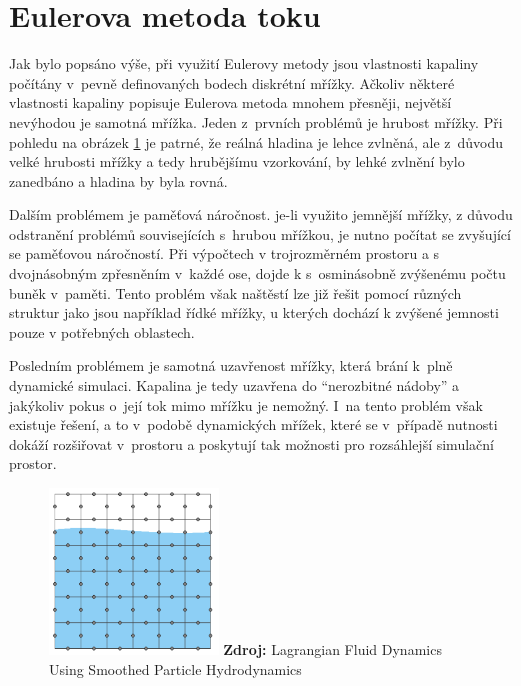 \section{Eulerova metoda toku}
Jak bylo popsáno výše, při využití Eulerovy metody jsou vlastnosti kapaliny počítány v~pevně definovaných bodech diskrétní mřížky. Ačkoliv některé vlastnosti kapaliny popisuje Eulerova metoda mnohem přesněji, největší nevýhodou je samotná mřížka. Jeden z~prvních problémů je hrubost mřížky. Při pohledu na obrázek \ref{fig:EulerGrid} je patrné, že reálná hladina je lehce zvlněná, ale z~důvodu velké hrubosti mřížky a tedy hrubějšímu vzorkování, by lehké zvlnění bylo zanedbáno a hladina by byla rovná.

Dalším problémem je paměťová náročnost. je-li využito jemnější mřížky, z důvodu odstranění problémů souvisejících s~hrubou mřížkou, je nutno počítat se zvyšující se paměťovou náročností. Při výpočtech v trojrozměrném prostoru a s dvojnásobným zpřesněním v~každé ose, dojde k s~osminásobně zvýšenému počtu buněk v~paměti. Tento problém však naštěstí lze již řešit pomocí různých struktur jako jsou například řídké mřížky, u kterých dochází k zvýšené jemnosti pouze v potřebných oblastech.

Posledním problémem je samotná uzavřenost mřížky, která brání k~plně dynamické simulaci. Kapalina je tedy uzavřena do \enquote{nerozbitné nádoby} a jakýkoliv pokus o~její tok mimo mřížku je nemožný. I~na tento problém však existuje řešení, a to v~podobě dynamických mřížek, které se v~případě nutnosti dokáží rozšiřovat v~prostoru a poskytují tak možnosti pro rozsáhlejší simulační prostor.
\cite{KelagerSPH}

\begin{figure}[hbt]
	\centering
	\captionsetup{justification=centering}
	\includegraphics[width=0.4\textwidth]{obrazky-figures/GridEuler.PNG}
	\textbf{Zdroj: } Lagrangian Fluid Dynamics Using Smoothed Particle Hydrodynamics \cite{KelagerSPH}
	\label{fig:EulerGrid}
\end{figure}

